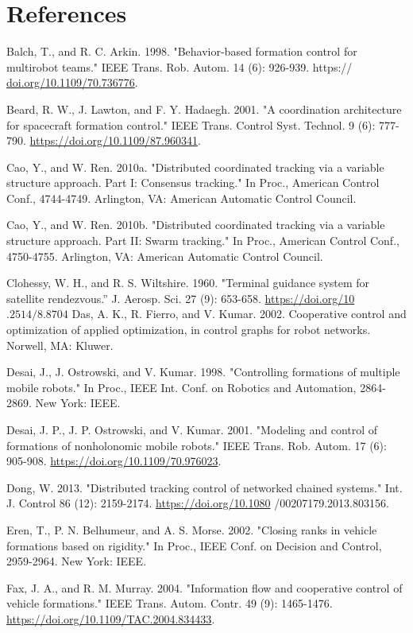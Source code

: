\documentclass[10pt]{article}
\begin{document}
\section{References}
Balch, T., and R. C. Arkin. 1998. "Behavior-based formation control for multirobot teams." IEEE Trans. Rob. Autom. 14 (6): 926-939. https:// \href{http://doi.org/10.1109/70.736776}{doi.org/10.1109/70.736776}.

Beard, R. W., J. Lawton, and F. Y. Hadaegh. 2001. "A coordination architecture for spacecraft formation control." IEEE Trans. Control Syst. Technol. 9 (6): 777-790. \href{https://doi.org/10.1109/87.960341}{https://doi.org/10.1109/87.960341}.

Cao, Y., and W. Ren. 2010a. "Distributed coordinated tracking via a variable structure approach. Part I: Consensus tracking." In Proc., American Control Conf., 4744-4749. Arlington, VA: American Automatic Control Council.

Cao, Y., and W. Ren. 2010b. "Distributed coordinated tracking via a variable structure approach. Part II: Swarm tracking." In Proc., American Control Conf., 4750-4755. Arlington, VA: American Automatic Control Council.

Clohessy, W. H., and R. S. Wiltshire. 1960. "Terminal guidance system for satellite rendezvous.” J. Aerosp. Sci. 27 (9): 653-658. \href{https://doi.org/10}{https://doi.org/10} $.2514 / 8.8704$
Das, A. K., R. Fierro, and V. Kumar. 2002. Cooperative control and optimization of applied optimization, in control graphs for robot networks. Norwell, MA: Kluwer.

Desai, J., J. Ostrowski, and V. Kumar. 1998. "Controlling formations of multiple mobile robots." In Proc., IEEE Int. Conf. on Robotics and Automation, 2864-2869. New York: IEEE.

Desai, J. P., J. P. Ostrowski, and V. Kumar. 2001. "Modeling and control of formations of nonholonomic mobile robots." IEEE Trans. Rob. Autom. 17 (6): 905-908. \href{https://doi.org/10.1109/70.976023}{https://doi.org/10.1109/70.976023}.

Dong, W. 2013. "Distributed tracking control of networked chained systems." Int. J. Control 86 (12): 2159-2174. \href{https://doi.org/10.1080}{https://doi.org/10.1080} /00207179.2013.803156.

Eren, T., P. N. Belhumeur, and A. S. Morse. 2002. "Closing ranks in vehicle formations based on rigidity." In Proc., IEEE Conf. on Decision and Control, 2959-2964. New York: IEEE.

Fax, J. A., and R. M. Murray. 2004. "Information flow and cooperative control of vehicle formations." IEEE Trans. Autom. Contr. 49 (9): 1465-1476. \href{https://doi.org/10.1109/TAC.2004.834433}{https://doi.org/10.1109/TAC.2004.834433}.
\end{document}
